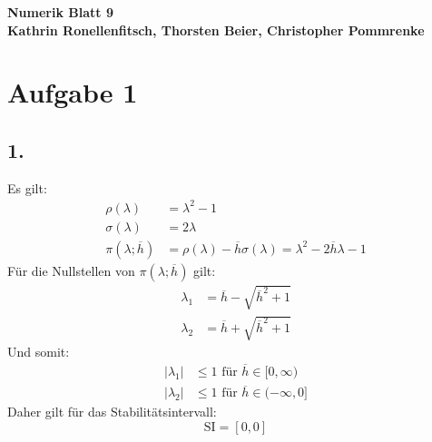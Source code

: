 \documentclass[10pt,oneside,a4paper]{scrartcl}
\begin{document}
    \begin{center}
        \huge %
        \bfseries %
        \sffamily %
        Numerik Blatt 9\\[1em]
        \normalsize
        Kathrin Ronellenfitsch, Thorsten Beier, Christopher Pommrenke
    \end{center}

    \section*{Aufgabe 1}
    \subsection*{1.}
    Es gilt:
    \begin{align*}
        \rho(\lambda) &= \lambda^2 - 1 \\
        \sigma(\lambda) &= 2\lambda \\
        \pi(\lambda; \overline{h}) &= \rho(\lambda) -
        \overline{h}\sigma(\lambda) = \lambda^2 - 2\overline{h}\lambda - 1
    \end{align*}
    Für die Nullstellen von $\pi(\lambda; \overline{h})$ gilt:
    \begin{align*}
        \lambda_1 & = \overline{h} - \sqrt{\overline{h}^2 + 1} \\
        \lambda_2 & = \overline{h} + \sqrt{\overline{h}^2 + 1}
    \end{align*}
    Und somit:
        \begin{align*}
        |\lambda_1| &\leq 1 \text{ für } \overline{h} \in [0, \infty) \\
        |\lambda_2| &\leq 1 \text{ für } \overline{h} \in (-\infty, 0]
    \end{align*}
    Daher gilt für das Stabilitätsintervall:
    \begin{equation*}
        \text{SI} = [0, 0]
    \end{equation*}
        
\end{document}
